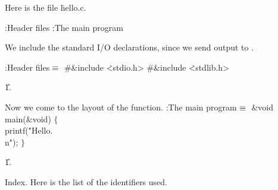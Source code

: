


Here is the file \.{hello.c}.

\Y\B{}:Header files\X\6
:The main program\X\par
\fi

We include the standard I/O declarations, since we send output to .

\Y\B\4:Header files\X${}\equiv{}$\6
\8\#\&{include} \.{<stdio.h>}\6
\8\#\&{include} \.{<stdlib.h>}\par
\U1.\fi

Now we come to the layout of the  function.
\Y\B\4:The main program\X${}\equiv{}$\6
\1\1\&{void} \\{main}(\&{void})\2\2\6
${}\{{}$\1\6
\\{printf}(\.{"Hello.\\n"});\6
\4${}\}{}$\2\par
\U1.\fi

Index.
Here is the list of the identifiers used.
\fi

\inx
\fin
\con
